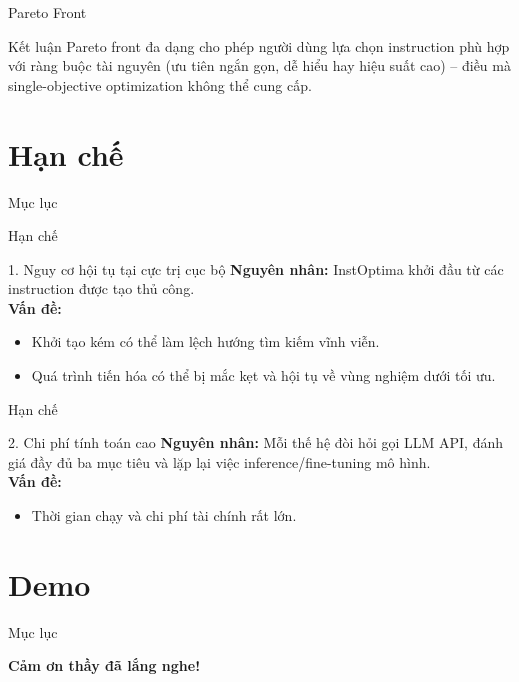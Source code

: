 \documentclass[12pt,xcolor=table]{beamer}
\begin{document}
\begin{frame}{Pareto Front}
    \begin{block}{Kết luận}
        Pareto front đa dạng cho phép người dùng lựa chọn instruction phù hợp với ràng buộc tài nguyên (ưu tiên ngắn gọn, dễ hiểu hay hiệu suất cao) -- điều mà single-objective optimization không thể cung cấp.
    \end{block}
\end{frame}

\section{Hạn chế}

\begin{frame}{Mục lục}
    \tableofcontents[currentsection]
\end{frame}

\begin{frame}{Hạn chế}
    \begin{block}{1. Nguy cơ hội tụ tại cực trị cục bộ}
        \textbf{Nguyên nhân:} InstOptima khởi đầu từ các instruction được tạo thủ công. \\
        \textbf{Vấn đề:}
        \begin{itemize}
            \item Khởi tạo kém có thể làm lệch hướng tìm kiếm vĩnh viễn.
            \item Quá trình tiến hóa có thể bị mắc kẹt và hội tụ về vùng nghiệm dưới tối ưu.
        \end{itemize}
    \end{block}
\end{frame}

\begin{frame}{Hạn chế}
    \begin{block}{2. Chi phí tính toán cao}
        \textbf{Nguyên nhân:} Mỗi thế hệ đòi hỏi gọi LLM API, đánh giá đầy đủ ba mục tiêu và lặp lại việc inference/fine-tuning mô hình. \\
        \textbf{Vấn đề:}
        \begin{itemize}
            \item Thời gian chạy và chi phí tài chính rất lớn.
        \end{itemize}
    \end{block}
\end{frame}

\section{Demo}
\begin{frame}{Mục lục}
    \tableofcontents[currentsection]
\end{frame}

\begin{frame}
\begin{center}
\Large{\textbf{Cảm ơn thầy đã lắng nghe!}}
\end{center}
\end{frame}
\end{document}
